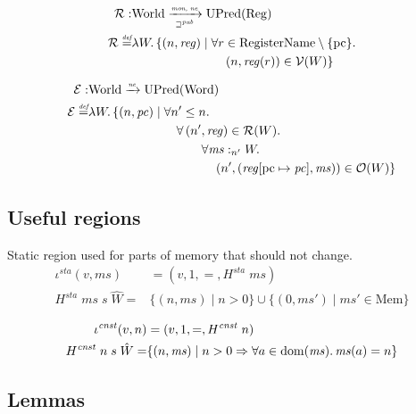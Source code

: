 \documentclass[a4paper]{article}
\newcommand{\update}[2]{[#1 \mapsto #2]}
\newcommand{\nefun}{\xrightarrow{\textit{\tiny{ne}}}}
\newcommand{\defeq}{\stackrel{\textit{\tiny{def}}}{=}}
\newcommand{\union}{\mathbin{\cup}}
\DeclareMathOperator{\dom}{dom}
\newcommand{\var}[1]{\mathit{#1}}
\newcommand{\hs}{\var{ms}}
\newcommand{\ms}{\hs}
\newcommand{\pc}{\mathit{pc}}
\newcommand{\pcreg}{\mathrm{pc}}
\newcommand{\reg}{\var{reg}}
\newcommand{\heap}{\var{mem}}
\newcommand{\sta}{\var{sta}}
\newcommand{\cnst}{\var{cnst}}
\newcommand{\futurewk}{\mathbin{\sqsupseteq}^{\var{pub}}}
\newcommand{\heapSat}[3][\heap]{#1 :_{#2} #3}
\newcommand{\monwknefun}{\xrightarrow[\text{\tiny{$\futurewk$}}]{\textit{\tiny{mon, ne}}}}
\newcommand{\asmType}{\plaindom{AsmType}}
\newcommand{\plaindom}[1]{\mathrm{#1}}
\newcommand{\Words}{\plaindom{Word}}
\newcommand{\RegName}{\plaindom{RegisterName}}
\newcommand{\Regs}{\plaindom{Reg}}
\newcommand{\Heaps}{\plaindom{Mem}}
\newcommand{\Mems}{\Heaps}
\newcommand{\Worlds}{\plaindom{World}}
\newcommand{\UPred}[1]{\plaindom{UPred}(#1)}
\newcommand{\intr}[2]{\mathcal{#1}}
\newcommand{\valueintr}[1]{\intr{V}{#1}}
\newcommand{\exprintr}[1]{\intr{E}{#1}}
\newcommand{\regintr}[1]{\intr{R}{#1}}
\newcommand{\stdvr}{\valueintr{\asmType}}
\newcommand{\stder}{\exprintr{\asmType}}
\newcommand{\stdrr}{\regintr{\asmType}}
\newcommand{\observations}{\mathcal{O}}
\newcommand{\npair}[2][n]{\left(#1,#2 \right)}
\begin{document}
\begin{lemma}
\begin{align*}
  \stdrr : & \Worlds \monwknefun \UPred{\Regs} \\
  \stdrr \defeq & \lambda W \ldotp
                  \begin{aligned}[t]
                    \{ \npair{\reg} \mid & \;\forall r \in \RegName \setminus \{\pcreg\} \ldotp \\
                    & \;\quad  \npair{\reg(r)} \in \stdvr(W) \}
                  \end{aligned}
\end{align*}

\begin{align*}
  \stder : & \Worlds \nefun \UPred{\Words} \\
  \stder \defeq & \lambda W \ldotp \{ \npair{\pc} \mid 
                  \begin{aligned}[t]
                    & \forall n' \leq n \ldotp\\
                    & \quad \forall \npair[n']{\reg} \in \stdrr(W) \ldotp \\
                    & \quad \qquad  \forall \heapSat[\hs]{n'}{W} \ldotp \\
                    & \quad \qquad \quad \npair[n']{(\reg\update{\pcreg}{\pc},\hs)} \in \observations(W) \}
                  \end{aligned}
\end{align*}

\subsection{Useful regions}
Static region used for parts of memory that should not change.
\begin{align*}
  \iota^\sta (v,\ms) &= (v,1,=,H^\sta\;\ms)\\
  H^\sta \; \ms \; s \; \hat{W} = & \{\npair{\ms} \mid n > 0 \} \union \{\npair[0]{\ms'} \mid \ms' \in \Mems \}
\end{align*}

\begin{align*}
  \iota^\cnst (v,n) &= (v,1,=,H^\cnst\;n)\\
  H^\cnst \; n \; s \; \hat{W} = & \{\npair{\ms} \mid n > 0 \Rightarrow \forall a \in \dom(\ms)\ldotp \ms(a) = n \}
\end{align*}

\subsection{Lemmas}


\end{lemma}
\end{document}

